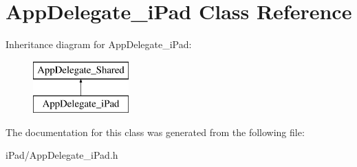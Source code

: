 \hypertarget{interface_app_delegate__i_pad}{
\section{AppDelegate\_\-iPad Class Reference}
\label{interface_app_delegate__i_pad}
}
Inheritance diagram for AppDelegate\_\-iPad:\begin{figure}[H]
\begin{center}
\leavevmode
\includegraphics[height=2.000000cm]{interface_app_delegate__i_pad}
\end{center}
\end{figure}


The documentation for this class was generated from the following file:\begin{DoxyCompactItemize}
\item 
iPad/AppDelegate\_\-iPad.h\end{DoxyCompactItemize}
